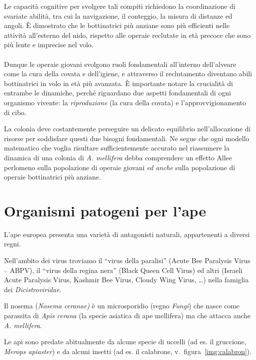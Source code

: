 Le capacità cognitive per svolgere tali compiti richiedono la coordinazione di svariate abilità, tra cui la navigazione, il conteggio, la misura di distanze ed angoli.
È dimostrato che le bottinatrici più anziane sono più efficienti nelle attività all'esterno del nido, rispetto alle operaie reclutate in età precoce che sono più lente e imprecise nel volo.

\paragraph{}
Dunque le operaie giovani svolgono ruoli fondamentali all'interno dell'alveare come la cura della covata e dell'igiene, e attraverso il reclutamento diventano abili bottinatrici in volo in età più avanzata.
È importante notare la crucialità di entrambe le dinamiche, perché riguardano due aspetti fondamentali di ogni organismo vivente: la \emph{riproduzione} (la cura della covata) e l'approvvigionamento di cibo.

La colonia deve costantemente perseguire un delicato equilibrio nell'allocazione di risorse per soddisfare questi due bisogni fondamentali.
Ne segue che ogni modello matematico che voglia risultare sufficientemente accurato nel riassumere la dinamica di una colonia di \emph{A. mellifera} debba comprendere un effetto Allee perlomeno sulla popolazione di operaie giovani
\emph{ed anche} sulla popolazione di operaie bottinatrici più anziane.

\section{Organismi patogeni per l'ape}
L'ape europea presenta una varietà di antagonisti naturali, appartenenti a diversi regni.

Nell'ambito dei virus troviamo il ``virus della paralisi'' (Acute Bee Paralysis Virus -- ABPV), il ``virus della regina nera'' (Black Queen Cell Virus) ed altri (Israeli Acute Paralysis Virus, Kashmir Bee Virus, Cloudy Wing Virus, \dots) nella famiglia dei \emph{Dicistroviridae}.

Il nosema (\emph{Nosema ceranae)} è un microsporidio (regno \emph{Fungi}) che nasce come parassita di \emph{Apis cerana} (la specie asiatica di ape mellifera) ma che attacca anche \emph{A. mellifera}.

Le api sono predate abitualmente da alcune specie di uccelli (ad es. il gruccione, \emph{Merops apiaster}) e da alcuni insetti (ad es. il calabrone, v.~figura~\ref{img:calabron}).

